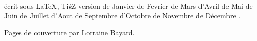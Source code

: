 
\begin{titlepage}
\,
\vfill

\hfill écrit sous \LaTeX, Ti\emph{k}Z
\renewcommand{\today}{\ifcase\month\or de Janvier \or de Fevrier \or de Mars
                                   \or d'Avril   \or de Mai     \or de Juin
                                   \or de Juillet \or d'Aout \or de Septembre
                                   \or d'Octobre \or de Novembre \or 
                                       de Décembre \fi \number \year}
version \today.

\hfill Pages de couverture par Lorraine Bayard.

\hfill \doclicenseLongText

\hfill \doclicenseImage[imagewidth=10em]
\end{titlepage}
